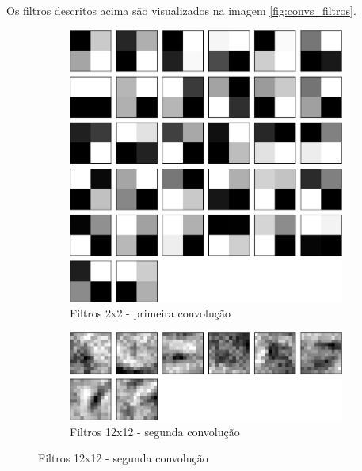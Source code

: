 \documentclass[
	12pt,				%
	oneside,			%
	a4paper,			%
	english,			%
	french,				%
	spanish,			%
	brazil,				%
	]{abntex2}
\begin{document}
\par Os filtros descritos acima são visualizados na imagem \autoref{fig:convs_filtros}.

\begin{figure}[H]
	\centering
	
	\begin{subfigure}{.8\textwidth}
		\centering
		\includegraphics[width=.6\linewidth]{images/fabio/resultados/network_3/filter_convolution2d_1}%
		\caption{Filtros 2x2 - primeira convolução}		
		\label{fig:conv1_filtro}	
	\end{subfigure}%
	
	\begin{subfigure}{.8\textwidth}
		\centering
		\includegraphics[width=.6\linewidth]{images/fabio/resultados/network_3/filter_convolution2d_2}
		\caption{Filtros 12x12 - segunda convolução}		
		\label{fig:conv2_filtro}	
	\end{subfigure}%
	

\end{figure}
\end{document}
